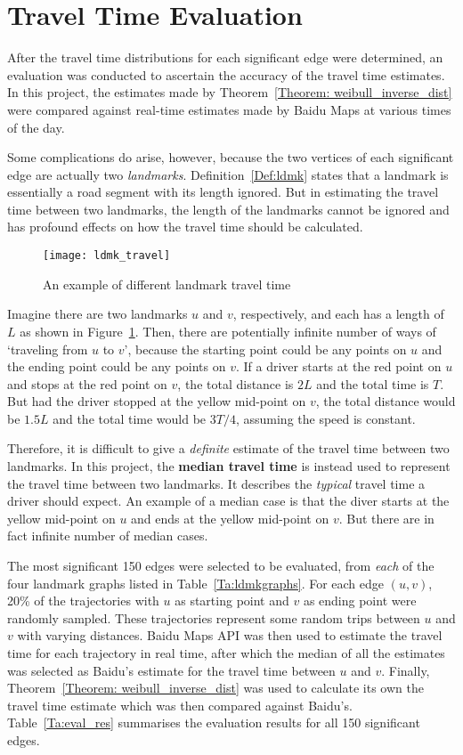\section{Travel Time Evaluation}
After the travel time distributions for each significant edge were determined, an eva\-luation was conducted to ascertain the accuracy of the travel time estimates. In this project, the estimates made by Theorem~\ref{Theorem: weibull_inverse_dist} were compared against real-time estimates made by Baidu Maps at various times of the day. 

Some complications do arise, however, because the two vertices of each significant edge are actually two \emph{landmarks}. Definition~\ref{Def:ldmk} states that a landmark is essentially a road segment with its length ignored. But in estimating the travel time between two landmarks, the length of the landmarks cannot be ignored and has profound effects on how the travel time should be calculated. 

\begin{figure}[h!]
\texttt{[image: ldmk\_travel]}
\centering
\caption{An example of different landmark travel time}\label{Fig:ldmk_travel}
\end{figure}

Imagine there are two landmarks $u$ and $v$, respectively, and each has a length of $L$ as shown in Figure~\ref{Fig:ldmk_travel}. Then, there are potentially infinite number of ways of `traveling from $u$ to $v$', because the starting point could be any points on $u$ and the ending point could be any points on $v$. If a driver starts at the red point on $u$ and stops at the red point on $v$, the total distance is $2L$ and the total time is $T$. But had the driver stopped at the yellow mid-point on $v$, the total distance would be $1.5L$ and the total time would be $3T/4$, assuming the speed is constant. 

Therefore, it is difficult to give a \emph{definite} estimate of the travel time between two landmarks. In this project, the \textbf{median travel time} is instead used to represent the travel time between two landmarks. It describes the \emph{typical} travel time a driver should expect. An example of a median case is that the diver starts at the yellow mid-point on $u$ and ends at the yellow mid-point on $v$. But there are in fact infinite number of median cases. 

The most significant 150 edges were selected to be evaluated, from \emph{each} of the four landmark graphs listed in Table~\ref{Ta:ldmkgraphs}. For each edge $(u, v)$, 20\% of the trajectories with $u$ as starting point and $v$ as ending point were randomly sampled. These trajectories represent some random trips between $u$ and $v$ with varying distances. Baidu Maps API was then used to estimate the travel time for each trajectory in real time, after which the median of all the estimates was selected as Baidu's estimate for the travel time between $u$ and $v$. Finally, Theorem~\ref{Theorem: weibull_inverse_dist} was used to calculate its own the travel time estimate which was then compared against Baidu's. Table~\ref{Ta:eval_res} summarises the evaluation results for all 150 significant edges. 

